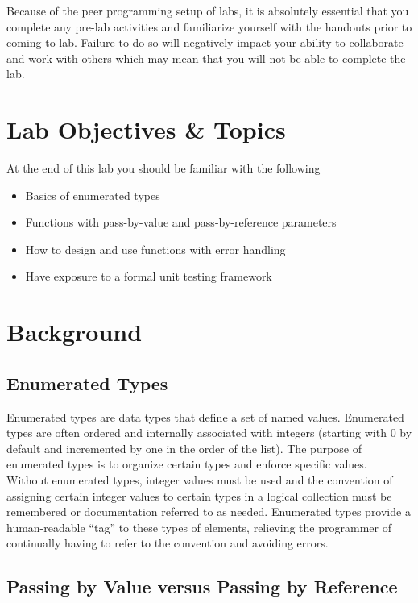 \documentclass[12pt]{scrartcl}
\begin{document}
Because of the peer programming setup of labs, it is absolutely 
essential that you complete any pre-lab activities and familiarize
yourself with the handouts prior to coming to lab.  Failure to do
so will negatively impact your ability to collaborate and work with 
others which may mean that you will not be able to complete the
lab.  

\section{Lab Objectives \& Topics}
At the end of this lab you should be familiar with the following
\begin{itemize}
  \item Basics of enumerated types
  \item Functions with pass-by-value and pass-by-reference parameters
  \item How to design and use functions with error handling
  \item Have exposure to a formal unit testing framework 
\end{itemize}

\section{Background}

\subsection*{Enumerated Types}

Enumerated types are data types that define a set of named values.  
Enumerated types are often ordered and internally associated with 
integers (starting with 0 by default and incremented by one in the 
order of the list).  The purpose of enumerated types is to organize 
certain types and enforce specific values.  Without enumerated types, 
integer values must be used and the convention of assigning certain 
integer values to certain types in a logical collection must be remembered 
or documentation referred to as needed.  Enumerated types provide 
a human-readable ``tag'' to these types of elements, relieving the 
programmer of continually having to refer to the convention and avoiding 
errors.

\subsection*{Passing by Value versus Passing by Reference}
\end{document}

